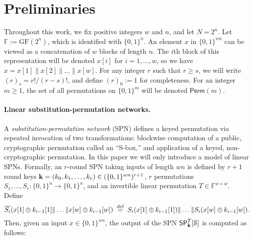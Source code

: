 \documentclass[journal=tosc,final,nohyperref]{iacrtrans}
\begin{document}





\section{Preliminaries}
\label{sec:preliminary}

Throughout this work, we fix positive integers $w$ and $n$, and let $N=2^n$. Let $\mathbb{F}:=\text{GF}(2^n)$, which is identified with $\{0,1\}^n$. An element $x$ in $\{0,1\}^{wn}$ can be viewed as a concatenation of $w$ blocks of length $n$. The $i$th block of this representation will be denoted $x[i]$ for $i=1,\ldots,w$, so we have $x=x[1]\|x[2]\|\ldots\|x[w]$. For any integer $r$ such that $r\geq s$, we will write $(r)_s = r!/(r-s)!$, and define $(r)_0:=1$ for completeness. For an integer $m\geq1$, the set of all permutations on $\{0, 1\}^m$ will be denoted $\textsf{Perm}(m)$.




%


\paragraph{Linear substitution-permutation networks.}

A {\it substitution-permutation network} (SPN) defines a keyed permutation via repeated invocation of two transformations: blockwise computation of a public, cryptographic permutation called an ``S-box,'' and application of a keyed, non-cryptographic permutation. In this paper we will only introduce a model of linear SPNs.
%
%
Formally, an $r$-round SPN taking inputs of length $w n$ is defined by $r+1$ round keys $\mathbf{k}=(k_0,k_1,\ldots,k_r)\in(\{0,1\}^{wn})^{r+1}$, $r$ permutations $S_1,\ldots,S_r:\{0,1\}^{n} \rightarrow \{0,1\}^{n}$, and an invertible linear permutation $T\in\mathbb{F}^{w\times w}$. Define
%
%
$$\overline{S_i}(x[1]\oplus k_{i-1}[1]\|\ldots\| x[w]\oplus k_{i-1}[w]) \stackrel{\text { def }}{=} S_i(x[1]\oplus k_{i-1}[1])\|\ldots\| S_i(x[w]\oplus k_{i-1}[w]).$$
%
%
Then, given an input $x \in \{0,1\}^{w n}$, the output of the SPN $\mathsf{SP}_{\mathbf{k}}^T[\mathcal{S}]$ is computed as follows:
\end{document}

